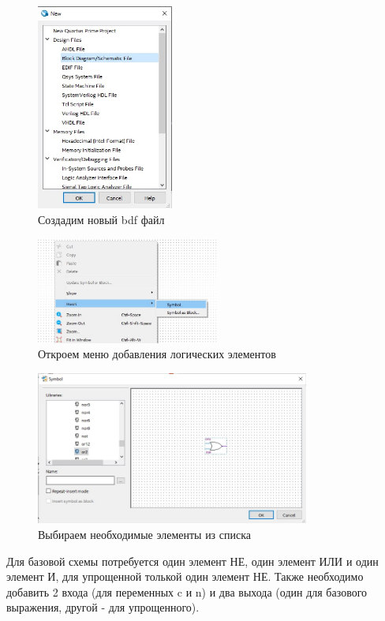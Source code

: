 \documentclass[a4paper,12pt]{article}
\begin{document}
  \begin{figure}[H]
    \centering
    \includegraphics[width=4.5cm]{01_05}
    \caption{Создадим новый bdf файл}
  \end{figure}

  \begin{figure}[H]
    \centering
    \includegraphics[width=6cm]{01_06}
    \caption{Откроем меню добавления логических элементов}
  \end{figure}

  \begin{figure}[H]
    \centering
    \includegraphics[width=9cm]{01_07}
    \caption{Выбираем необходимые элементы из списка}
  \end{figure}

  Для базовой схемы потребуется один элемент НЕ, один элемент ИЛИ и один элемент И, для упрощенной
  толькой один элемент НЕ. Также необходимо добавить 2 входа (для переменных c и n) и два выхода
  (один для базового выражения, другой - для упрощенного).
\end{document}

